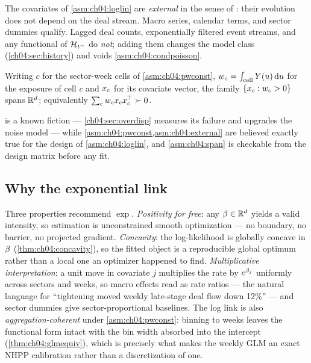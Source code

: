 \begin{assumption}\label{asm:ch04:external}
The covariates of \cref{asm:ch04:loglin} are \emph{external} in the sense
of \citet{kalbfleisch2002}: their evolution does not depend on the deal
stream. Macro series, calendar terms, and sector dummies qualify. Lagged
deal counts, exponentially filtered event streams, and any functional of
$\mathcal{H}_{t^-}$ do \emph{not}; adding them changes the model class
(\cref{ch04:sec:history}) and voids \cref{asm:ch04:condpoisson}.
\end{assumption}

\begin{assumption}[Spanning]\label{asm:ch04:span}
Writing $c$ for the sector-week cells of \cref{asm:ch04:pwconst}, $w_c =
\int_{\text{cell}} Y(u) \,\mathrm{d} u$ for the exposure of cell $c$ and
$x_c$ for its covariate vector, the family $\{x_c : w_c > 0\}$
spans $\mathbb{R}^{d}$; equivalently $\sum_c w_c x_c x_c^{\top} \succ 0$.
\end{assumption}

 is a known fiction --- \cref{ch04:sec:overdisp}
measures its failure and upgrades the noise model --- while
\cref{asm:ch04:pwconst,asm:ch04:external} are believed exactly true for
the design of \cref{asm:ch04:loglin}, and \cref{asm:ch04:span} is checkable
from the design matrix before any fit.

\subsection{Why the exponential link}\label{ch04:sec:link}

Three properties recommend $\exp$. \emph{Positivity for free}: any $\beta \in
\mathbb{R}^{d}$ yields a valid intensity, so estimation is unconstrained smooth
optimization --- no boundary, no barrier, no projected gradient.
\emph{Concavity}: the log-likelihood is globally concave in $\beta$
(\cref{thm:ch04:concavity}), so the fitted object is a reproducible global
optimum rather than a local one an optimizer happened to find.
\emph{Multiplicative interpretation}: a unit move in covariate $j$
multiplies the rate by $e^{\beta_j}$ uniformly across sectors and weeks,
so macro effects read as rate ratios --- the natural language for
``tightening moved weekly late-stage deal flow down 12\%'' --- and sector
dummies give sector-proportional baselines. The log link is also
\emph{aggregation-coherent} under \cref{asm:ch04:pwconst}: binning to weeks
leaves the functional form intact with the bin width absorbed into the
intercept (\cref{thm:ch04:glmequiv}), which is precisely what makes the
weekly GLM an exact NHPP calibration rather than a discretization of one.

